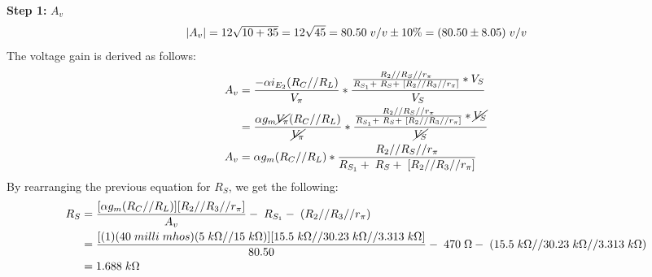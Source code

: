 \documentclass{article}
\begin{document}
	\noindent\textbf{Step 1:} $A_v$\\ $$|A_v| = 12\sqrt{10 + 35} = 12\sqrt{45} = 80.50 \hspace{1mm} v/v \pm 10\% = (80.50 \pm 8.05) \hspace{1mm} v/v$$
	\noindent The voltage gain is derived as follows:
	\begin{align*}
		A_v &= \frac{-\alpha i_{E_2} (R_C // R_L)} {V_{\pi}} * \frac{\frac{R_2 // R_S // r_{\pi}}{R_{S_1} + \hspace{1mm}R_S + \hspace{1mm} [R_2 // R_3 // r_{\pi}]} * V_S}{V_S}\\
		&= \frac{\alpha g_m \cancel{V_{\pi}} (R_C // R_L)} {\cancel{V_{\pi}}} * \frac{\frac{R_2 // R_S // r_{\pi}}{R_{S_1} + \hspace{1mm}R_S + \hspace{1mm}[R_2 // R_3 // r_{\pi}]} * \cancel{V_S}}{\cancel{V_S}}\\
		A_v &= \alpha g_m (R_C // R_L) * \frac{R_2 // R_S // r_{\pi}}{R_{S_1} + \hspace{1mm}R_S + \hspace{1mm}[R_2 // R_3 // r_{\pi}]}
	\end{align*}
	\noindent By rearranging the previous equation for $R_S$, we get the following:
	\begin{align*}
		R_S &= \frac{[\alpha g_m (R_C // R_L)] [R_2 // R_3 // r_{\pi}]}{A_v} - \hspace{1mm} R_{S_1} - \hspace{1mm} (R_2 // R_3 // r_{\pi})\\
		&= \frac{[(1)(40 \hspace{1mm} milli \hspace{1mm} mhos) (5 \hspace{1mm} k\Omega // 15 \hspace{1mm} k\Omega)] [15.5 \hspace{1mm} k\Omega // 30.23 \hspace{1mm} k\Omega // 3.313 \hspace{1mm} k\Omega]}{80.50} - \hspace{1mm} 470 \hspace{1mm} \Omega - \hspace{1mm} (15.5 \hspace{1mm} k\Omega // 30.23 \hspace{1mm} k\Omega // 3.313 \hspace{1mm} k\Omega)\\
		&= 1.688 \hspace{1mm} k\Omega
	\end{align*}
\end{document}
